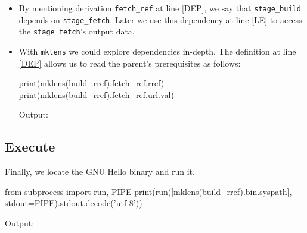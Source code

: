 \begin{itemize}
  \item By mentioning derivation \texttt{fetch\_ref} at line \ref{DEP}, we say
    that \texttt{stage\_build} depends on \texttt{stage\_fetch}. Later we use
    this dependency at line \ref{LE} to access the \texttt{stage\_fetch}'s
    output data.

  \item With \texttt{mklens} we could explore dependencies in-depth. The
    definition at line \ref{DEP} allows us to read the parent's prerequisites as
    follows:

    \begin{pythontexcode}
    print(mklens(build_rref).fetch_ref.rref)
    print(mklens(build_rref).fetch_ref.url.val)
    \end{pythontexcode}

    Output:

    \mysmallstdout

\end{itemize}

\pagebreak
\subsection{Execute}

Finally, we locate the GNU Hello binary and run it.

\begin{pythontexcode}
from subprocess import run, PIPE
print(run([mklens(build_rref).bin.syspath], stdout=PIPE).stdout.decode('utf-8'))
\end{pythontexcode}

Output:

\mystdout



